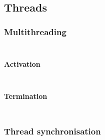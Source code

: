 \begin{align*}
  [ ~ 
  \KEY{Funcon} ~ & \NAMEHYPER{../../../../../Unstable-Funcons-beta/Computations/Abnormal}{Postponing}{postpone} \\
  \KEY{Funcon} ~ & \NAMEHYPER{../../../../../Unstable-Funcons-beta/Computations/Abnormal}{Postponing}{postpone-after-effect}
  ~ ]
\end{align*}
\subsection*{Threads}\hypertarget{threads}{}\label{threads}

\subsubsection*{Multithreading}\hypertarget{multithreading}{}\label{multithreading}

\begin{align*}
  [ ~ 
  \KEY{Funcon} ~ & \NAMEHYPER{../../../../../Unstable-Funcons-beta/Computations/Threads}{Multithreading}{thread-joinable}
  ~ ]
\end{align*}
\paragraph*{Activation}\hypertarget{activation}{}\label{activation}

\begin{align*}
  [ ~ 
  \KEY{Funcon} ~ & \NAMEHYPER{../../../../../Unstable-Funcons-beta/Computations/Threads}{Multithreading}{multithread} \\
  \KEY{Funcon} ~ & \NAMEHYPER{../../../../../Unstable-Funcons-beta/Computations/Threads}{Multithreading}{thread-activate}
  ~ ]
\end{align*}
\paragraph*{Termination}\hypertarget{termination}{}\label{termination}

\begin{align*}
  [ ~ 
  \KEY{Funcon} ~ & \NAMEHYPER{../../../../../Unstable-Funcons-beta/Computations/Threads}{Multithreading}{thread-join}
  ~ ]
\end{align*}
\subsubsection*{Thread synchronisation}\hypertarget{thread-synchronisation}{}\label{thread-synchronisation}

